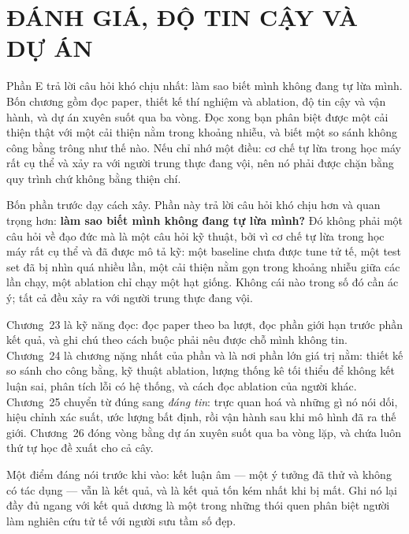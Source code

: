 \documentclass[../deep_learning.tex]{subfiles}
\begin{document}
\part{ĐÁNH GIÁ, ĐỘ TIN CẬY VÀ DỰ ÁN}
\begin{tomtat}
Phần E trả lời câu hỏi khó chịu nhất: làm sao biết mình không đang tự lừa mình. Bốn chương gồm đọc paper, thiết kế thí nghiệm và ablation, độ tin cậy và vận hành, và dự án xuyên suốt qua ba vòng. Đọc xong bạn phân biệt được một cải thiện thật với một cải thiện nằm trong khoảng nhiễu, và biết một so sánh không công bằng trông như thế nào. Nếu chỉ nhớ một điều: cơ chế tự lừa trong học máy rất cụ thể và xảy ra với người trung thực đang vội, nên nó phải được chặn bằng quy trình chứ không bằng thiện chí.
\end{tomtat}

Bốn phần trước dạy cách xây. Phần này trả lời câu hỏi khó chịu hơn và quan trọng hơn: \textbf{làm sao biết mình không đang tự lừa mình?} Đó không phải một câu hỏi về đạo đức mà là một câu hỏi kỹ thuật, bởi vì cơ chế tự lừa trong học máy rất cụ thể và đã được mô tả kỹ: một baseline chưa được tune tử tế, một test set đã bị nhìn quá nhiều lần, một cải thiện nằm gọn trong khoảng nhiễu giữa các lần chạy, một ablation chỉ chạy một hạt giống. Không cái nào trong số đó cần ác ý; tất cả đều xảy ra với người trung thực đang vội.

Chương~23 là kỹ năng đọc: đọc paper theo ba lượt, đọc phần giới hạn trước phần kết quả, và ghi chú theo cách buộc phải nêu được chỗ mình không tin. Chương~24 là chương nặng nhất của phần và là nơi phần lớn giá trị nằm: thiết kế so sánh cho công bằng, kỹ thuật ablation, lượng thống kê tối thiểu để không kết luận sai, phân tích lỗi có hệ thống, và cách đọc ablation của người khác. Chương~25 chuyển từ đúng sang \emph{đáng tin}: trực quan hoá và những gì nó nói dối, hiệu chỉnh xác suất, ước lượng bất định, rồi vận hành sau khi mô hình đã ra thế giới. Chương~26 đóng vòng bằng dự án xuyên suốt qua ba vòng lặp, và chứa luôn thứ tự học đề xuất cho cả cây.

Một điểm đáng nói trước khi vào: kết luận âm --- một ý tưởng đã thử và không có tác dụng --- vẫn là kết quả, và là kết quả tốn kém nhất khi bị mất. Ghi nó lại đầy đủ ngang với kết quả dương là một trong những thói quen phân biệt người làm nghiên cứu tử tế với người sưu tầm số đẹp.





\ifSubfilesClassLoaded{\printbibliography[title={Nguồn}]}{}
\end{document}
